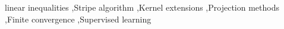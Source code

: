 \documentclass[a4paper,fleqn]{cas-sc}
\begin{document}



\begin{keywords}
linear inequalities \sep  Stripe algorithm \sep Kernel extensions \sep Projection methods \sep Finite convergence
\sep Supervised learning 
\end{keywords}

\maketitle







\end{document}
